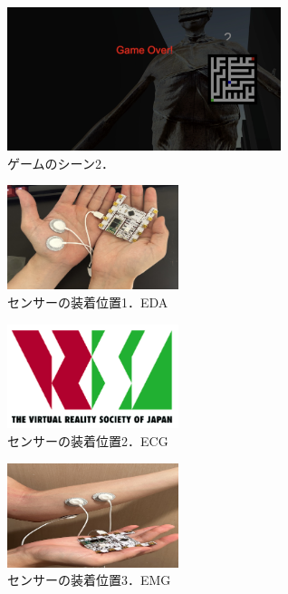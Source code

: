 \documentclass[a4paper]{jarticle}
\begin{document}
\begin{figure}[tb]
  \begin{center}
    \includegraphics*[width=80mm]{game2.png}
  \end{center}
  \vspace*{-6mm}
  \caption{ゲームのシーン2．}
  \label{figure2}
\end{figure}

\begin{figure}[tb]
  \begin{center}
    \includegraphics*[width=50mm]{figure3_eda.jpg}
  \end{center}
  \caption{センサーの装着位置1．EDA}
  \label{figure3}
\end{figure}

\begin{figure}[tb]
  \begin{center}
    \includegraphics*[width=50mm]{logo.png}
  \end{center}
  \vspace*{-6mm}
  \caption{センサーの装着位置2．ECG}
  \label{figure4}
\end{figure}

\begin{figure}[tb]
  \begin{center}
    \includegraphics*[width=50mm]{figure5_emg.jpg}
  \end{center}
  \caption{センサーの装着位置3．EMG}
  \label{figure5}
\end{figure}
\end{document}
